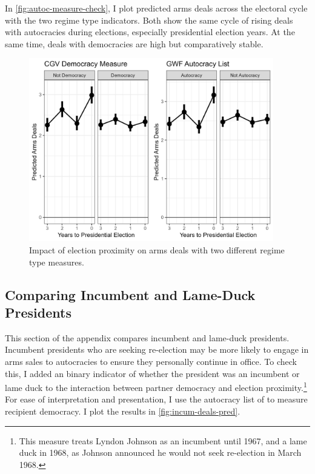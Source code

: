 \documentclass[12pt]{article}
\begin{document}
In \autoref{fig:autoc-measure-check}, I plot predicted arms deals across the electoral cycle with the two regime type indicators. 
Both show the same cycle of rising deals with autocracies during elections, especially presidential election years. 
At the same time, deals with democracies are high but comparatively stable. 

\begin{figure}[htpb]
	\centering
		\includegraphics[width=0.95\textwidth]{autoc-measure-check.png}
	\caption{Impact of election proximity on arms deals with two different regime type measures.}
	\label{fig:autoc-measure-check}
\end{figure}



\subsection{Comparing Incumbent and Lame-Duck Presidents}

This section of the appendix compares incumbent and lame-duck presidents. 
Incumbent presidents who are seeking re-election may be more likely to engage in arms sales to autocracies to ensure they personally continue in office. 
To check this, I added an binary indicator of whether the president was an incumbent or lame duck to the interaction between partner democracy and election proximity.\footnote{This measure treats Lyndon Johnson as an incumbent until 1967, and a lame duck in 1968, as Johnson announced he would not seek re-election in March 1968.}
For ease of interpretation and presentation, I use the autocracy list of \citet{Geddes2014} to measure recipient democracy.
I plot the results in \autoref{fig:incum-deals-pred}.
\end{document}
